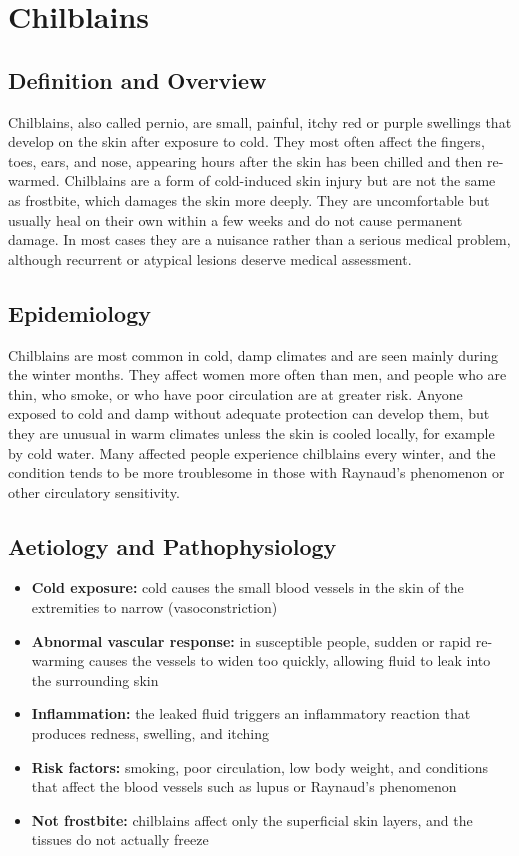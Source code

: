 \chapter{Chilblains}

\section*{Definition and Overview}
Chilblains, also called pernio, are small, painful, itchy red or purple swellings that develop on the skin after exposure to cold. They most often affect the fingers, toes, ears, and nose, appearing hours after the skin has been chilled and then re-warmed. Chilblains are a form of cold-induced skin injury but are not the same as frostbite, which damages the skin more deeply. They are uncomfortable but usually heal on their own within a few weeks and do not cause permanent damage. In most cases they are a nuisance rather than a serious medical problem, although recurrent or atypical lesions deserve medical assessment.

\section*{Epidemiology}
Chilblains are most common in cold, damp climates and are seen mainly during the winter months. They affect women more often than men, and people who are thin, who smoke, or who have poor circulation are at greater risk. Anyone exposed to cold and damp without adequate protection can develop them, but they are unusual in warm climates unless the skin is cooled locally, for example by cold water. Many affected people experience chilblains every winter, and the condition tends to be more troublesome in those with Raynaud's phenomenon or other circulatory sensitivity.

\section*{Aetiology and Pathophysiology}
\begin{itemize}
    \item \textbf{Cold exposure:} cold causes the small blood vessels in the skin of the extremities to narrow (vasoconstriction)
    \item \textbf{Abnormal vascular response:} in susceptible people, sudden or rapid re-warming causes the vessels to widen too quickly, allowing fluid to leak into the surrounding skin
    \item \textbf{Inflammation:} the leaked fluid triggers an inflammatory reaction that produces redness, swelling, and itching
    \item \textbf{Risk factors:} smoking, poor circulation, low body weight, and conditions that affect the blood vessels such as lupus or Raynaud's phenomenon
    \item \textbf{Not frostbite:} chilblains affect only the superficial skin layers, and the tissues do not actually freeze
\end{itemize}

